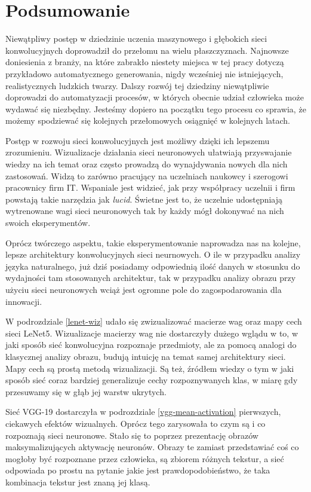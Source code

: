 \chapter{Podsumowanie}
\label{chap:summary}

Niewątpliwy postęp w dziedzinie uczenia maszynowego i głębokich sieci konwolucyjnych doprowadził do przełomu na wielu płaszczyznach. Najnowsze doniesienia z branży, na które zabrakło niestety miejsca w tej pracy dotyczą przykładowo automatycznego generowania, nigdy wcześniej nie istniejących, realistycznych ludzkich twarzy.
Dalszy rozwój tej dziedziny niewątpliwie doprowadzi do automatyzacji procesów, w których obecnie udział człowieka może wydawać się niezbędny. Jesteśmy dopiero na początku tego procesu co sprawia, że możemy spodziewać się kolejnych przełomowych osiągnięć w kolejnych latach.

Postęp w rozwoju sieci konwolucyjnych jest możliwy dzięki ich lepszemu zrozumieniu. Wizualizacje działania sieci neuronowych ułatwiają przyswajanie wiedzy na ich temat oraz często prowadzą do wynajdywania nowych dla nich zastosowań. Widzą to zarówno pracujący na uczelniach naukowcy i szerogowi pracownicy firm IT. Wspaniale jest widzieć, jak przy współpracy uczelnii i firm powstają takie narzędzia jak \textit{lucid}. Świetne jest to, że uczelnie udostępniają wytrenowane
wagi sieci neuronowych tak by każdy mógł dokonywać na nich swoich eksperymentów.

Oprócz twórczego aspektu, takie eksperymentowanie naprowadza nas na kolejne, lepsze architektury konwolucyjnych sieci neurnowych. O ile w przypadku analizy języka naturalnego, już dziś posiadamy odpowiednią ilość danych w stosunku do wydajności tam stosowanych architektur, tak w przypadku analizy obrazu przy użyciu sieci neuronowych wciąż jest ogromne pole do zagospodarowania dla innowacji.

W podrozdziale \ref{lenet-wiz} udało się zwizualizować macierze wag oraz mapy cech sieci LeNet5. Wizualizacje macierzy wag nie dostarczyły dużego wglądu w to, w jaki sposób sieć konwolucyjna rozpoznaje przedmioty, ale za pomocą analogi do klasycznej analizy obrazu, budują intuicję na temat samej architektury sieci. Mapy cech są prostą metodą wizualizacji. Są też, źródłem wiedzy o tym w jaki sposób sieć coraz bardziej generalizuje cechy rozpoznywanych klas, w miarę gdy przesuwamy się
w głąb jej warstw ukrytych.  

Sieć VGG-19 dostarczyła w podrozdziale \ref{vgg-mean-activation} pierwszych, ciekawych efektów wizualnych. Oprócz tego zarysowała to czym są i co rozpoznają sieci neuronowe. Stało się to poprzez prezentację obrazów maksymalizujących aktywację neuronów. Obrazy te zamiast przedstawiać coś co mogłoby być rozpoznane przez człowieka, są zbiorem różnych tekstur, a sieć odpowiada po prostu na pytanie jakie jest prawdopodobieństwo, że taka kombinacja tekstur jest znaną jej klasą.

